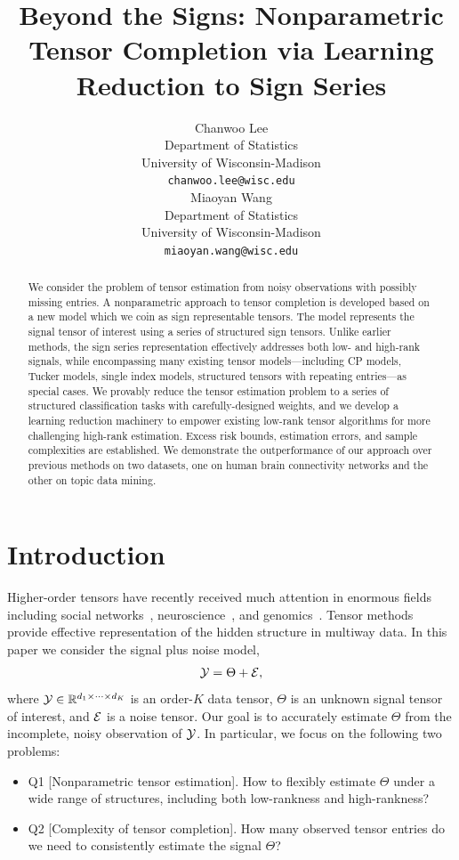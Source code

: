 \documentclass{article}
\title{Beyond the Signs: Nonparametric Tensor Completion via Learning Reduction to Sign Series}
\author{%
 Chanwoo Lee\\
  Department of Statistics\\
  University of Wisconsin-Madison\\
  \texttt{chanwoo.lee@wisc.edu} \\
   \And Miaoyan Wang \\
  Department of Statistics\\ 
   University of Wisconsin-Madison\\
   \texttt{miaoyan.wang@wisc.edu} \\
}
\theoremstyle{plain}
\theoremstyle{definition}
\begin{document}
\maketitle

\begin{abstract}
We consider the problem of tensor estimation from noisy observations with possibly missing entries. A nonparametric approach to tensor completion is developed based on a new model which we coin as sign representable tensors. The model represents the signal tensor of interest using a series of structured sign tensors. Unlike earlier methods, the sign series representation effectively addresses both low- and high-rank signals, while encompassing many existing tensor models---including CP models, Tucker models, single index models, structured tensors with repeating entries---as special cases. We provably reduce the tensor estimation problem to a series of structured classification tasks with carefully-designed weights, and we develop a learning reduction machinery to empower existing low-rank tensor algorithms for more challenging high-rank estimation. Excess risk bounds, estimation errors, and sample complexities are established. We demonstrate the outperformance of our approach over previous methods on two datasets, one on human brain connectivity networks and the other on topic data mining. 
\end{abstract}

\section{Introduction}\label{sec:intro}

Higher-order tensors have recently received much attention in enormous fields including social networks~\citep{anandkumar2014tensor}, neuroscience~\citep{wang2017bayesian}, and genomics~\citep{hore2016tensor}. Tensor methods provide effective representation of the hidden structure in multiway data. In this paper we consider the signal plus noise model,
\begin{equation}\label{eq:modelintro}
\mathcal{Y}=\Theta+\mathcal{E},
\end{equation}
where $\mathcal{Y}\in\mathbb{R}^{d_1\times \cdots \times d_K}$ is an order-$K$ data tensor, $\Theta$ is an unknown signal tensor of interest, and $\mathcal{E}$ is a noise tensor. Our goal is to accurately estimate $\Theta$ from the incomplete, noisy observation of $\mathcal{Y}$. In particular, we focus on the following two problems:
\begin{itemize}[leftmargin=*,labelindent=-10pt]
\item[] Q1 [Nonparametric tensor estimation]. How to flexibly estimate $\Theta$ under a wide range of structures, including both low-rankness and high-rankness?
\item[] Q2 [Complexity of tensor completion]. How many observed tensor entries do we need to consistently estimate the signal $\Theta$?
\end{itemize}
\end{document}
